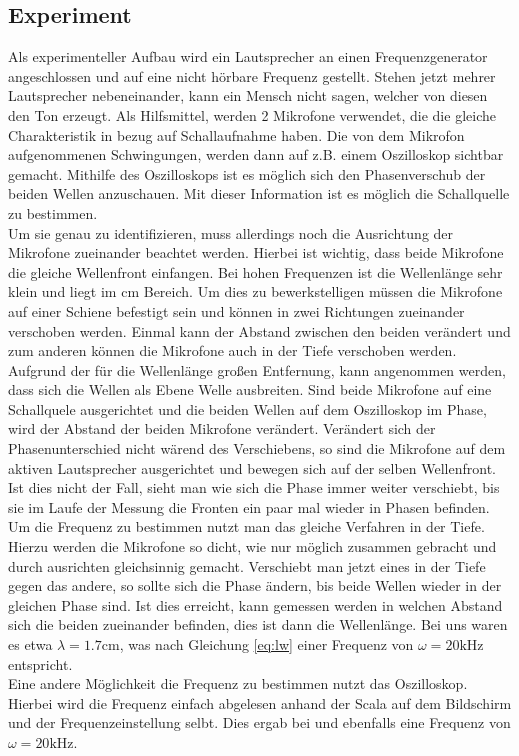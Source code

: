 \documentclass[12pt,a4paper,titlepage,headinclude]{scrartcl}
\numberwithin{equation}{subsection}
\begin{document}
\subsection{Experiment}
Als experimenteller Aufbau wird ein Lautsprecher an einen Frequenzgenerator angeschlossen und auf eine nicht hörbare Frequenz gestellt.
Stehen jetzt mehrer Lautsprecher nebeneinander, kann ein Mensch nicht sagen, welcher von diesen den Ton erzeugt.
Als Hilfsmittel, werden 2 Mikrofone verwendet, die die gleiche Charakteristik in bezug auf Schallaufnahme haben.
Die von dem Mikrofon aufgenommenen Schwingungen, werden dann auf z.B. einem Oszilloskop sichtbar gemacht.
Mithilfe des Oszilloskops ist es möglich sich den Phasenverschub der beiden Wellen anzuschauen.
Mit dieser Information ist es möglich die Schallquelle zu bestimmen.\\
Um sie genau zu identifizieren, muss allerdings noch die Ausrichtung der Mikrofone zueinander beachtet werden.
Hierbei ist wichtig, dass beide Mikrofone die gleiche Wellenfront einfangen.
Bei hohen Frequenzen ist die Wellenlänge sehr klein und liegt im $\si{\centi\meter}$ Bereich.
Um dies zu bewerkstelligen müssen die Mikrofone auf einer Schiene befestigt sein und können in zwei Richtungen zueinander verschoben werden.
Einmal kann der Abstand zwischen den beiden verändert und zum anderen können die Mikrofone auch in der Tiefe verschoben werden.
Aufgrund der für die Wellenlänge großen Entfernung, kann angenommen werden, dass sich die Wellen als Ebene Welle ausbreiten.
Sind beide Mikrofone auf eine Schallquele ausgerichtet und die beiden Wellen auf dem Oszilloskop im Phase, wird der Abstand der beiden Mikrofone verändert.
Verändert sich der Phasenunterschied nicht wärend des Verschiebens, so sind die Mikrofone auf dem aktiven Lautsprecher ausgerichtet und bewegen sich auf der selben Wellenfront.
Ist dies nicht der Fall, sieht man wie sich die Phase immer weiter verschiebt, bis sie im Laufe der Messung die Fronten ein paar mal wieder in Phasen befinden.\\
Um die Frequenz zu bestimmen nutzt man das gleiche Verfahren in der Tiefe.
Hierzu werden die Mikrofone so dicht, wie nur möglich zusammen gebracht und durch ausrichten gleichsinnig gemacht.
Verschiebt man jetzt eines in der Tiefe gegen das andere, so sollte sich die Phase ändern, bis beide Wellen wieder in der gleichen Phase sind.
Ist dies erreicht, kann gemessen werden in welchen Abstand sich die beiden zueinander befinden, dies ist dann die Wellenlänge.
Bei uns waren es etwa $\lambda=1.7\si{\centi\meter}$, was nach Gleichung \ref{eq:lw} einer Frequenz von $\omega=20\si{\kilo\hertz}$ entspricht.\\
Eine andere Möglichkeit die Frequenz zu bestimmen nutzt das Oszilloskop.
Hierbei wird die Frequenz einfach abgelesen anhand der Scala auf dem Bildschirm und der Frequenzeinstellung selbt.
Dies ergab bei und ebenfalls eine Frequenz von $\omega=20\si{\kilo\hertz}$.
\end{document}
